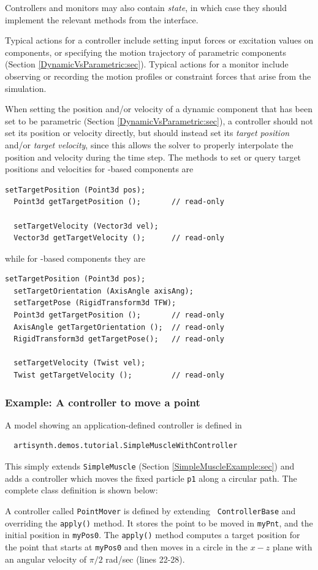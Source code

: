 Controllers and monitors may also contain {\it state}, in which case
they should implement the relevant methods from the
 interface.

Typical actions for a controller include setting input forces or
excitation values on components, or specifying the motion trajectory
of parametric components (Section \ref{DynamicVsParametric:sec}).
Typical actions for a monitor include observing or recording
the motion profiles or constraint forces that arise
from the simulation.

When setting the position and/or velocity of a dynamic component that
has been set to be parametric (Section \ref{DynamicVsParametric:sec}),
a controller should not set its position or velocity directly, but
should instead set its {\it target position} and/or {\it target
velocity}, since this allows the solver to properly interpolate the
position and velocity during the time step. The methods to set or
query target positions and velocities for
-based components are
%
\begin{lstlisting}[]
  setTargetPosition (Point3d pos);
  Point3d getTargetPosition ();       // read-only

  setTargetVelocity (Vector3d vel);
  Vector3d getTargetVelocity ();      // read-only
\end{lstlisting}
%
while for
-based components they are
%
\begin{lstlisting}[]
  setTargetPosition (Point3d pos);
  setTargetOrientation (AxisAngle axisAng);
  setTargetPose (RigidTransform3d TFW);
  Point3d getTargetPosition ();       // read-only
  AxisAngle getTargetOrientation ();  // read-only
  RigidTransform3d getTargetPose();   // read-only

  setTargetVelocity (Twist vel);
  Twist getTargetVelocity ();         // read-only
\end{lstlisting}
%

\subsubsection{Example: A controller to move a point}

A model showing an application-defined controller is defined in
%
\begin{verbatim}
  artisynth.demos.tutorial.SimpleMuscleWithController
\end{verbatim}
%
This simply extends {\tt SimpleMuscle} (Section
\ref{SimpleMuscleExample:sec}) and adds a controller which moves the
fixed particle {\tt p1} along a circular path.  The complete class
definition is shown below:
%
\lstset{numbers=left}

\lstset{numbers=none}
%
A controller called {\tt PointMover} is defined by extending {\tt
ControllerBase} and overriding the {\tt apply()} method. It stores the
point to be moved in {\tt myPnt}, and the initial position in
{\tt myPos0}. The {\tt apply()} method computes a target position for
the point that starts at {\tt myPos0} and then moves in a circle in the
$x-z$ plane with an angular velocity of $\pi/2$ rad/sec (lines 22-28).


